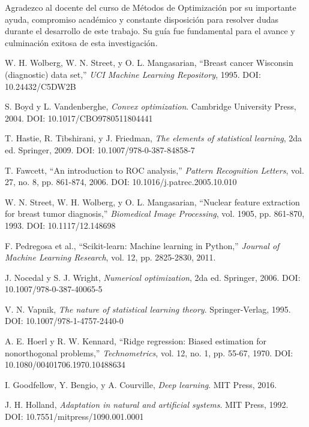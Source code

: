 \documentclass[conference]{IEEEtran}
\begin{document}
Agradezco al docente del curso de Métodos de Optimización por su importante ayuda, compromiso académico y constante disposición para resolver dudas durante el desarrollo de este trabajo. Su guía fue fundamental para el avance y culminación exitosa de esta investigación.

\begin{thebibliography}{00}
 W. H. Wolberg, W. N. Street, y O. L. Mangasarian, ``Breast cancer Wisconsin (diagnostic) data set,'' \textit{UCI Machine Learning Repository}, 1995. DOI: 10.24432/C5DW2B

 S. Boyd y L. Vandenberghe, \textit{Convex optimization}. Cambridge University Press, 2004. DOI: 10.1017/CBO9780511804441

 T. Hastie, R. Tibshirani, y J. Friedman, \textit{The elements of statistical learning}, 2da ed. Springer, 2009. DOI: 10.1007/978-0-387-84858-7

 T. Fawcett, ``An introduction to ROC analysis,'' \textit{Pattern Recognition Letters}, vol. 27, no. 8, pp. 861-874, 2006. DOI: 10.1016/j.patrec.2005.10.010

 W. N. Street, W. H. Wolberg, y O. L. Mangasarian, ``Nuclear feature extraction for breast tumor diagnosis,'' \textit{Biomedical Image Processing}, vol. 1905, pp. 861-870, 1993. DOI: 10.1117/12.148698

 F. Pedregosa et al., ``Scikit-learn: Machine learning in Python,'' \textit{Journal of Machine Learning Research}, vol. 12, pp. 2825-2830, 2011.

 J. Nocedal y S. J. Wright, \textit{Numerical optimization}, 2da ed. Springer, 2006. DOI: 10.1007/978-0-387-40065-5

 V. N. Vapnik, \textit{The nature of statistical learning theory}. Springer-Verlag, 1995. DOI: 10.1007/978-1-4757-2440-0

 A. E. Hoerl y R. W. Kennard, ``Ridge regression: Biased estimation for nonorthogonal problems,'' \textit{Technometrics}, vol. 12, no. 1, pp. 55-67, 1970. DOI: 10.1080/00401706.1970.10488634

 I. Goodfellow, Y. Bengio, y A. Courville, \textit{Deep learning}. MIT Press, 2016.

 J. H. Holland, \textit{Adaptation in natural and artificial systems}. MIT Press, 1992. DOI: 10.7551/mitpress/1090.001.0001


\end{thebibliography}
\end{document}
